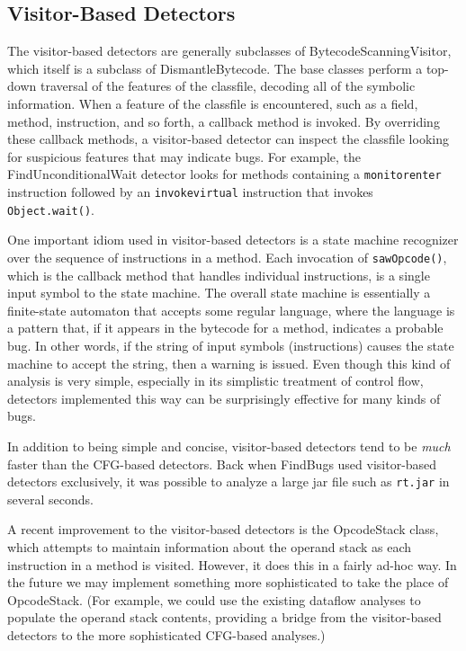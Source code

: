 \documentclass[11pt]{article}
\begin{document}
\subsection{Visitor-Based Detectors}

The visitor-based detectors are generally subclasses of BytecodeScanningVisitor,
which itself is a subclass of DismantleBytecode.  The base classes perform
a top-down traversal of the features of the classfile, decoding all
of the symbolic information.  When a feature of the classfile is encountered,
such as a field, method, instruction, and so forth, a callback method is
invoked.  By overriding these callback methods, a visitor-based detector
can inspect the classfile looking for suspicious features that may
indicate bugs.  For example, the FindUnconditionalWait detector looks for
methods containing a {\tt monitorenter} instruction followed by an {\tt invokevirtual}
instruction that invokes {\tt Object.wait()}.

One important idiom used in visitor-based detectors is a state machine
recognizer over the sequence of instructions in a method.
Each invocation of {\tt sawOpcode()}, which is the callback method
that handles individual instructions, is a single input symbol to
the state machine.  The overall state machine is essentially a finite-state
automaton that accepts some regular language, where the language is a
pattern that, if it appears in the bytecode for a method, indicates
a probable bug.  In other words, if the string of input symbols (instructions)
causes the state machine to accept the string, then a warning is issued.
Even though this kind of analysis is very simple,
especially in its simplistic treatment of control flow, detectors implemented
this way can be surprisingly effective for many kinds of bugs.

In addition to being simple and concise, visitor-based detectors
tend to be {\em much} faster than the CFG-based detectors.  Back when FindBugs
used visitor-based detectors exclusively, it was possible to analyze a large
jar file such as {\tt rt.jar} in several seconds.

A recent improvement to the visitor-based detectors is the OpcodeStack
class, which attempts to maintain information about the operand stack as
each instruction in a method is visited.  However, it does this in a fairly
ad-hoc way.  In the future we may implement something more sophisticated
to take the place of OpcodeStack.  (For example, we could use the existing
dataflow analyses to populate the operand stack contents, providing a bridge
from the visitor-based detectors to the more sophisticated CFG-based
analyses.)
\end{document}
